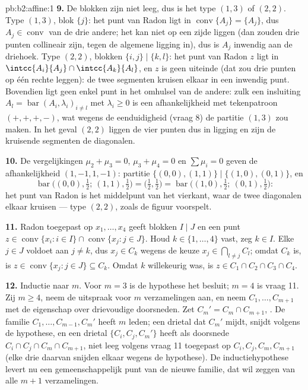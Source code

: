 \begin{solution}{pb:b2:affine:1}
\textbf{9.} De blokken zijn niet leeg, dus is het type $(1,3)$ of
$(2,2)$. Type $(1,3)$, blok $\{j\}$: het punt van Radon ligt in
$\operatorname{conv}\{A_j\} = \{A_j\}$, dus $A_j \in
\operatorname{conv}$ van de drie andere; het kan niet op een zijde
liggen (dan zouden drie punten collineair zijn, tegen de algemene
ligging in), dus is $A_j$ inwendig aan de driehoek. Type $(2,2)$,
blokken $\{i,j\} \mid \{k,l\}$: het punt van Radon $z$ ligt in
$\intcc{A_i}{A_j} \cap \intcc{A_k}{A_l}$, en $z$ is geen uiteinde
(dat zou drie punten op één rechte leggen): de twee segmenten
kruisen elkaar in een inwendig punt. Bovendien ligt geen enkel punt
in het omhulsel van de andere: zulk een insluiting $A_l =
\operatorname{bar}(A_i, \lambda_i)_{i \neq l}$ met $\lambda_i \geq
0$ is een  afhankelijkheid met tekenpatroon $(+,+,+,-)$, wat
wegens de eenduidigheid (vraag 8) de partitie $(1,3)$ zou maken.
In het geval $(2,2)$ liggen de vier punten dus in  ligging
en zijn de kruisende segmenten de diagonalen.

\textbf{10.} De vergelijkingen $\mu_2 + \mu_3 = 0$, $\mu_3 + \mu_4
= 0$ en $\sum\mu_i = 0$ geven de afhankelijkheid $(1, -1, 1, -1)$:
partitie $\{(0,0), (1,1)\} \mid \{(1,0), (0,1)\}$, en
\[
\operatorname{bar}\bigl((0,0), \tfrac12;\ (1,1),
\tfrac12\bigr) = \bigl(\tfrac12, \tfrac12\bigr) =
\operatorname{bar}\bigl((1,0), \tfrac12;\ (0,1),
\tfrac12\bigr) :
\]
het punt van Radon is het middelpunt van het vierkant, waar de twee
diagonalen elkaar kruisen --- type $(2,2)$, zoals de figuur
voorspelt.

\textbf{11.} Radon toegepast op $x_1, \dots, x_4$ geeft blokken $I
\mid J$ en een punt $z \in \operatorname{conv}\{x_i : i \in I\}
\cap \operatorname{conv}\{x_j : j \in J\}$. Houd $k \in \{1, \dots,
4\}$ vast, zeg $k \in I$. Elke $j \in J$ voldoet aan $j \neq k$,
dus $x_j \in C_k$ wegens de keuze $x_j \in \bigcap_{l \neq
j}C_l$; omdat $C_k$  is, is $z \in \operatorname{conv}\{x_j :
j \in J\} \subseteq C_k$. Omdat $k$ willekeurig was, is $z \in C_1
\cap C_2 \cap C_3 \cap C_4$.

\textbf{12.} Inductie naar $m$. Voor $m = 3$ is de hypothese het
besluit; $m = 4$ is vraag 11. Zij $m \geq 4$, neem de uitspraak
voor $m$ verzamelingen aan, en neem $C_1, \dots, C_{m+1}$ met de
eigenschap over drievoudige doorsneden. Zet $C_m' = C_m \cap
C_{m+1}$, . De familie $C_1, \dots, C_{m-1}, C_m'$ heeft $m$
leden; een drietal dat $C_m'$ mijdt, snijdt volgens de hypothese,
en een drietal $\{C_i, C_j, C_m'\}$ heeft als doorsnede $C_i \cap
C_j \cap C_m \cap C_{m+1}$, niet leeg volgens vraag 11 toegepast op
$C_i, C_j, C_m, C_{m+1}$ (elke drie daarvan snijden elkaar wegens
de hypothese). De inductiehypothese levert nu een gemeenschappelijk
punt van de nieuwe familie, dat wil zeggen van alle $m+1$
verzamelingen.


\end{solution}
